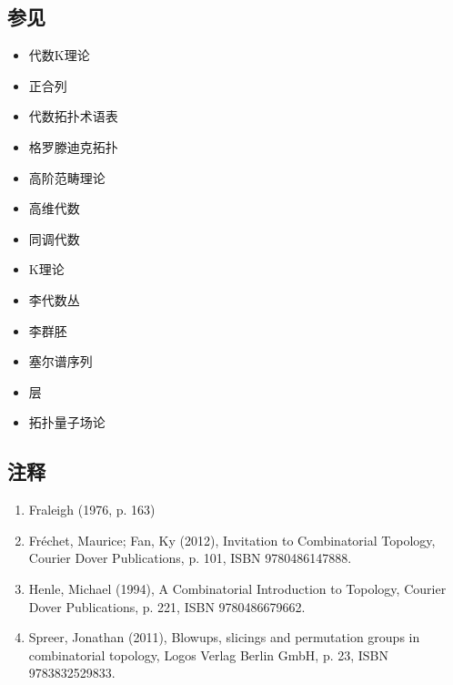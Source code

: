 \subsection{参见}
\begin{itemize}
\item 代数K理论
\item 正合列
\item 代数拓扑术语表
\item 格罗滕迪克拓扑
\item 高阶范畴理论
\item 高维代数
\item 同调代数
\item K理论
\item 李代数丛
\item 李群胚
\item 塞尔谱序列
\item 层
\item 拓扑量子场论
\end{itemize}
\subsection{注释}
\begin{enumerate}
\item Fraleigh (1976, p. 163)
\item Fréchet, Maurice; Fan, Ky (2012), Invitation to Combinatorial Topology, Courier Dover Publications, p. 101, ISBN 9780486147888.
\item Henle, Michael (1994), A Combinatorial Introduction to Topology, Courier Dover Publications, p. 221, ISBN 9780486679662.
\item Spreer, Jonathan (2011), Blowups, slicings and permutation groups in combinatorial topology, Logos Verlag Berlin GmbH, p. 23, ISBN 9783832529833.
\end{enumerate}
